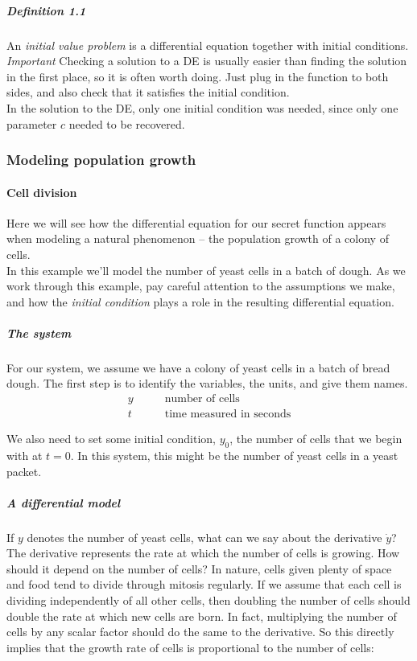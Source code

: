 \documentclass[8pt, a4paper]{article}
\begin{document}
\subparagraph{Definition 1.1} An \emph{\color{blue} initial value problem}
is a differential equation together with initial conditions.\\

\emph{\color{orange} Important} Checking a solution to a DE is usually easier
than finding the solution in the first place, so it is often worth doing.
Just plug in the function to both sides, and also check that it satisfies the initial condition.\\

In the solution to the DE, only one initial condition was needed,
since only one parameter $c$ needed to be recovered.
\clearpage

\subsubsection{Modeling population growth}
\paragraph{Cell division}
Here we will see how the differential equation for our secret function appears when modeling a natural phenomenon – the population growth of a colony of cells.\\

In this example we'll model the number of yeast cells in a batch of dough.
As we work through this example, pay careful attention to the assumptions we make, and how the \emph{\color{blue} initial condition} plays a role in the resulting differential equation.
\subparagraph{\color{blue} The system}
For our system, we assume we have a colony of yeast cells in a batch of bread dough.
The first step is to identify the variables, the units, and give them names.
\begin{align*}
  y\qquad &\text{number of cells}\\
  t\qquad &\text{time measured in seconds}
\end{align*}

We also need to set some initial condition, $y_0$, the number of cells that we begin with at $t=0$.
In this system, this might be the number of yeast cells in a yeast packet.
\subparagraph{\color{blue} A differential model}
If $y$ denotes the number of yeast cells, what can we say about the derivative $\dot{y}$?
The derivative represents the rate at which the number of cells is growing.
How should it depend on the number of cells?
In nature, cells given plenty of space and food tend to divide through mitosis regularly.
If we assume that each cell is dividing independently of all other cells, then doubling the number of cells should double the rate at which new cells are born.
In fact, multiplying the number of cells by any scalar factor should do the same to the derivative.
So this directly implies that the growth rate of cells is proportional to the number of cells:
\end{document}

